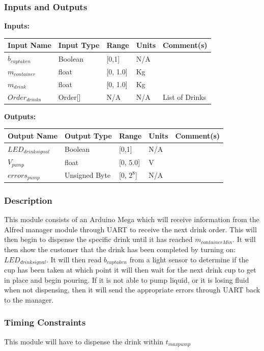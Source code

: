 \documentclass [10pt]{article}
\begin{document}
\subsubsection{Inputs and Outputs}

\textbf{Inputs: } 

\begin{longtable}{|l|l|l|l|l|}\hline 
		\rowcolor{tableCell}Input Name & Input Type & Range & Units & Comment(s) \\ \hline
		$ b_{cuptaken } $ & Boolean & [0,1] & N/A &  \\ \hline
		$ m_{container} $ & float & [0, 1.0]& Kg & \\ \hline
		$ m_{drink} $    & float & [0, 1.0] & Kg &  \\ \hline
		$ Order_{drinks} $ & Order[] & N/A  & N/A & List of Drinks  \\ \hline
\end{longtable}
\textbf{Outputs: } 
\begin{longtable}{|l|l|l|l|l|}\hline 
	\rowcolor{tableCell}Output Name & Output Type & Range & Units & Comment(s) \\ \hline
	$ LED_{drinksignal} $ & Boolean & [0,1] & N/A &  \\ \hline
	$ V_{pump } $ & float & [0, 5.0]& V & \\ \hline
	$  errors_{pump} $ & Unsigned Byte & [0, $2^{8}$]& N/A & \\ \hline
\end{longtable}
\subsubsection{Description}
This module consists of an Arduino Mega which will receive information from the Alfred manager module through UART to receive the next drink order. This will then begin to dispense the specific drink until it has reached $ m_{containerMin} $. It will then show the customer that the drink has been completed by turning on: $ LED_{drinksignal} $. It will then read $ b_{cuptaken} $ from a light sensor to determine if the cup has been taken at which point it will then wait for the next drink cup to get in place and begin pouring. If it is not able to pump liquid, or it is losing fluid when not dispensing, then it will send the appropriate errors through UART back to the manager.

\subsubsection{Timing Constraints}
This module will have to dispense the drink within $ t_{maxpump} $
\end{document}
